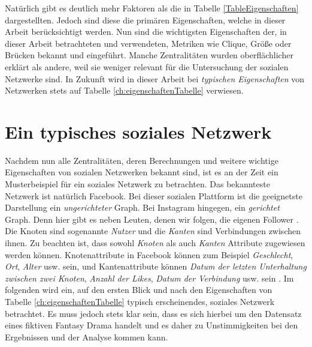 Natürlich gibt es deutlich mehr Faktoren als die in Tabelle \ref{TableEigenschaften} dargestellten. Jedoch sind diese die primären Eigenschaften, welche in dieser Arbeit berücksichtigt werden.
Nun sind die wichtigsten Eigenschaften der, in dieser Arbeit betrachteten und verwendeten, Metriken wie Clique, Größe oder Brücken bekannt und eingeführt. Manche Zentralitäten wurden oberflächlicher erklärt als andere, weil sie weniger relevant für die Untersuchung der sozialen Netzwerke sind. In Zukunft wird in dieser Arbeit bei \textit{typischen Eigenschaften} von Netzwerken stets auf Tabelle \ref{ch:eigenschaftenTabelle} verwiesen.

\newpage
\section{Ein typisches soziales Netzwerk}
Nachdem nun alle Zentralitäten, deren Berechnungen und weitere wichtige Eigenschaften von sozialen Netzwerken bekannt sind, ist es an der Zeit ein Musterbeispiel für ein soziales Netzwerk zu betrachten. Das bekannteste Netzwerk ist natürlich Facebook. Bei dieser sozialen Plattform ist die geeignetste Darstellung ein \textit{ungerichteter} Graph. Bei Instagram hingegen, ein \textit{gerichtet} Graph. Denn hier gibt es neben Leuten, denen wir folgen, die eigenen Follower \cite{fbInsta}. Die Knoten sind sogenannte \textit{Nutzer} und die \textit{Kanten} sind Verbindungen zwischen ihnen. Zu beachten ist, dass sowohl \textit{Knoten} als auch \textit{Kanten} Attribute zugewiesen werden können. Knotenattribute in Facebook können zum Beispiel \textit{Geschlecht}, \textit{Ort}, \textit{Alter} usw. sein, und Kantenattribute können \textit{Datum der letzten Unterhaltung zwischen zwei Knoten}, \textit{Anzahl der Likes}, \textit{Datum der Verbindung} usw. sein \cite{GOT}.
Im folgenden wird ein, auf den ersten Blick und nach den Eigenschaften von \\ 
Tabelle \ref{ch:eigenschaftenTabelle} typisch erscheinendes, soziales Netzwerk betrachtet. Es muss jedoch stets klar sein, dass es sich hierbei um den Datensatz eines fiktiven Fantasy Drama handelt \cite{GOT} und es daher zu Unstimmigkeiten bei den Ergebnissen und der Analyse kommen kann.

